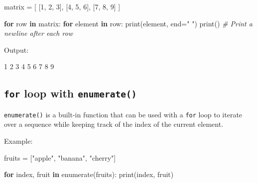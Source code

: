 \documentclass[
  paper=a4,
  ,captions=tableheading
]{scrartcl}
\newenvironment{Shaded}{}{}
\newcommand{\BuiltInTok}[1]{\textcolor[rgb]{0.00,0.50,0.00}{#1}}
\newcommand{\CommentTok}[1]{\textcolor[rgb]{0.38,0.63,0.69}{\textit{#1}}}
\newcommand{\ControlFlowTok}[1]{\textcolor[rgb]{0.00,0.44,0.13}{\textbf{#1}}}
\newcommand{\DecValTok}[1]{\textcolor[rgb]{0.25,0.63,0.44}{#1}}
\newcommand{\ExtensionTok}[1]{#1}
\newcommand{\KeywordTok}[1]{\textcolor[rgb]{0.00,0.44,0.13}{\textbf{#1}}}
\newcommand{\NormalTok}[1]{#1}
\newcommand{\OperatorTok}[1]{\textcolor[rgb]{0.40,0.40,0.40}{#1}}
\newcommand{\StringTok}[1]{\textcolor[rgb]{0.25,0.44,0.63}{#1}}
\begin{document}
\begin{Shaded}
\begin{Highlighting}[]

\NormalTok{matrix }\OperatorTok{=}\NormalTok{ [}
\NormalTok{    [}\DecValTok{1}\NormalTok{, }\DecValTok{2}\NormalTok{, }\DecValTok{3}\NormalTok{],}
\NormalTok{    [}\DecValTok{4}\NormalTok{, }\DecValTok{5}\NormalTok{, }\DecValTok{6}\NormalTok{],}
\NormalTok{    [}\DecValTok{7}\NormalTok{, }\DecValTok{8}\NormalTok{, }\DecValTok{9}\NormalTok{]}
\NormalTok{]}

\ControlFlowTok{for}\NormalTok{ row }\KeywordTok{in}\NormalTok{ matrix:}
    \ControlFlowTok{for}\NormalTok{ element }\KeywordTok{in}\NormalTok{ row:}
        \BuiltInTok{print}\NormalTok{(element, end}\OperatorTok{=}\StringTok{" "}\NormalTok{)}
    \BuiltInTok{print}\NormalTok{()  }\CommentTok{\# Print a newline after each row}
\end{Highlighting}
\end{Shaded}

Output:

\begin{Shaded}
\begin{Highlighting}[]
\ExtensionTok{1}\NormalTok{ 2 3}
\ExtensionTok{4}\NormalTok{ 5 6}
\ExtensionTok{7}\NormalTok{ 8 9}
\end{Highlighting}
\end{Shaded}

\hypertarget{for-loop-with-enumerate}{%
\subsection{\texorpdfstring{\texttt{for} loop with
\texttt{enumerate()}}{for loop with enumerate()}}\label{for-loop-with-enumerate}}

\texttt{enumerate()} is a built-in function that can be used with a
\texttt{for} loop to iterate over a sequence while keeping track of the
index of the current element.

Example:

\begin{Shaded}
\begin{Highlighting}[]

\NormalTok{fruits }\OperatorTok{=}\NormalTok{ [}\StringTok{"apple"}\NormalTok{, }\StringTok{"banana"}\NormalTok{, }\StringTok{"cherry"}\NormalTok{]}

\ControlFlowTok{for}\NormalTok{ index, fruit }\KeywordTok{in} \BuiltInTok{enumerate}\NormalTok{(fruits):}
    \BuiltInTok{print}\NormalTok{(index, fruit)}
\end{Highlighting}
\end{Shaded}
\end{document}

